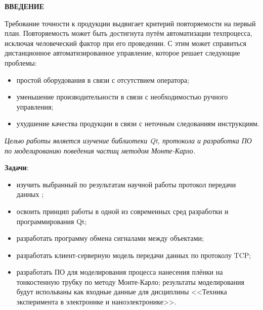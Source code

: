\documentclass[../AISTR.tex]{subfiles}
\begin{document}
\begin{center}
	\normalsize\bfseries\MakeUppercase{ВВЕДЕНИЕ}
\end{center}

Требование точности к продукции выдвигает критерий повторяемости на первый план. Повторяемость может быть достигнута путём автоматизации техпроцесса, исключая человеческий фактор при его проведении. С этим может справиться дистанционное автоматизированное управление, которое решает следующие проблемы:
\begin{itemize}
	\item простой оборудования в связи с отсутствием оператора;
	\item уменьшение производительности в связи с необходимостью ручного управления;
	\item ухудшение качества продукции в связи с неточным следованиям инструкциям.
\end{itemize}


\textit{Целью работы является изучение библиотеки Qt, протокола \mb и разработка ПО по моделированию поведения частиц методом Монте-Карло.}

\textbf{Задачи}:
\begin{itemize}
	\item  изучить выбранный по результатам научной работы протокол передачи данных \mb \tcp;
	\item освоить принцип работы в одной из современных сред разработки и программирования Qt;
	\item разработать программу обмена сигналами между объектами;
	\item разработать клиент-серверную модель передачи данных по протоколу TCP;
	\item разработать ПО для моделирования процесса нанесения плёнки на тонкостенную трубку по методу Монте-Карло; результаты моделирования будут испольваны как входные данные для дисциплины <<Техника эксперимента в электронике и наноэлектронике>>.
\end{itemize}
\end{document}
